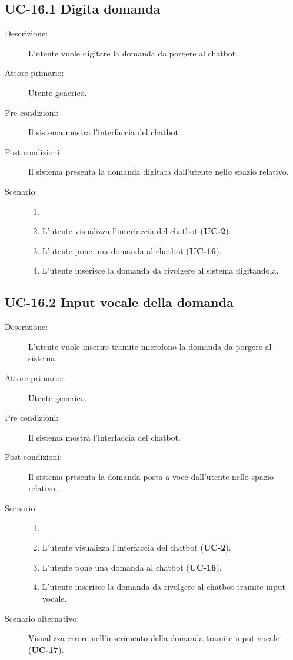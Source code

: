 \subsection{UC-16.1 Digita domanda}
\begin{description}
    \item[Descrizione:] L'utente vuole digitare la domanda da porgere al chatbot.
    \item[Attore primario:] Utente generico.
    \item[Pre condizioni:] Il sistema mostra l'interfaccia del chatbot.
    \item[Post condizioni:] Il sistema presenta la domanda digitata dall'utente nello spazio relativo.
    \item[Scenario:]
    \begin{enumerate}
        \item[] 
        \item L’utente visualizza l'interfaccia del chatbot (\textbf{UC-2}).
        \item L’utente pone una domanda al chatbot (\textbf{UC-16}).
        \item L'utente inserisce la domanda da rivolgere al sistema digitandola.
    \end{enumerate}
\end{description}

\subsection{UC-16.2 Input vocale della domanda}
\begin{description}
    \item[Descrizione:] L'utente vuole inserire tramite microfono la domanda da porgere al sistema.
    \item[Attore primario:] Utente generico.
    \item[Pre condizioni:] Il sistema mostra l'interfaccia del chatbot.
    \item[Post condizioni:] Il sistema presenta la domanda posta a voce dall'utente nello spazio relativo.
    \item[Scenario:]
    \begin{enumerate}
        \item[] 
        \item L’utente visualizza l'interfaccia del chatbot (\textbf{UC-2}).
        \item L’utente pone una domanda al chatbot (\textbf{UC-16}).
        \item L'utente inserisce la domanda da rivolgere al chatbot tramite input vocale.
    \end{enumerate}
    \item[Scenario alternativo:] Visualizza errore nell'inserimento della domanda tramite input vocale (\textbf{UC-17}).
\end{description}

